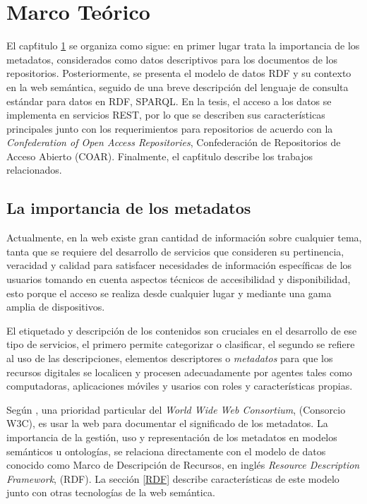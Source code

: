 \renewcommand{\chaptername}{Cap\'itulo}
\chapter{Marco Te\'orico} 
\label{MarcoTeorico}

El cap\'titulo \ref{MarcoTeorico} se organiza como sigue: en primer lugar trata la importancia de los metadatos, considerados como datos descriptivos para los documentos de los repositorios. Posteriormente, se presenta el modelo de datos RDF y su contexto en la web sem\'antica, seguido de una breve descripci\'on del lenguaje de consulta est\'andar para datos en RDF, SPARQL. En la tesis, el acceso a los datos se implementa en servicios REST, por lo que se describen sus caracter\'isticas principales junto con los requerimientos para repositorios de acuerdo con la  \emph{Confederation of Open Access Repositories},  Confederaci\'on de Repositorios de Acceso Abierto (COAR). Finalmente, el cap\'titulo describe los trabajos relacionados. 

\section{La importancia de los metadatos}

Actualmente, en la web existe gran cantidad de informaci\'on sobre cualquier tema, tanta que se requiere del desarrollo de servicios que consideren su pertinencia, veracidad y  calidad para satisfacer necesidades de informaci\'on espec\'ificas de los usuarios tomando en cuenta aspectos t\'ecnicos de accesibilidad y disponibilidad, esto porque el acceso se realiza desde cualquier lugar y mediante una gama amplia de dispositivos.\newline

El etiquetado y descripci\'on de los contenidos son cruciales en el desarrollo de ese tipo de servicios, el primero permite categorizar o clasificar, el segundo se refiere al uso de las descripciones, elementos descriptores o \emph{metadatos} para que los recursos digitales se localicen y procesen adecuadamente por agentes tales como computadoras, aplicaciones m\'oviles y usarios con roles y caracter\'isticas propias. \newline

Seg\'un \cite{W3C}, una prio\-ri\-dad particular del \emph{World Wide Web Consortium}, (Consorcio W3C), es usar la web para documentar el significado de los metadatos. La importancia de la gesti\'on, uso y representaci\'on de los metadatos en modelos sem\'anticos u ontolog\'ias, se relaciona directamente con el modelo de datos conocido como Marco de Descripci\'on de Recursos, en ingl\'es \emph{Resource Description Framework}, (RDF). La secci\'on \ref{RDF} describe caracter\'isticas de este modelo junto con otras tecnolog\'ias de la web sem\'antica.\newline

